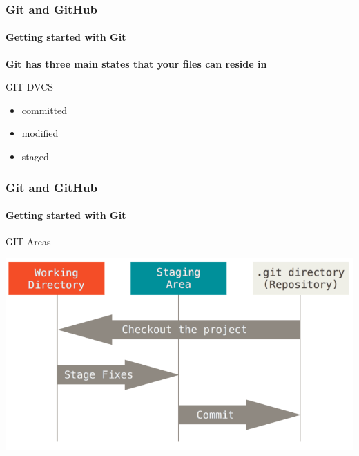 \begin{frame}
    \frametitle{Git and GitHub}
    \framesubtitle{Getting started with Git}
    \addtocounter{nframe}{1}
    
    \textbf{Git has three main states that your files can reside in}

    \begin{block}{GIT DVCS}
       \begin{itemize}
           \item committed
           \item modified 
           \item staged
       \end{itemize}
    
    \end{block}

\end{frame}

\begin{frame}
    \frametitle{Git and GitHub}
    \framesubtitle{Getting started with Git}
    \addtocounter{nframe}{1}
    
    \begin{block}{GIT Areas}
        \begin{center}

            \includegraphics[width=.9\textwidth]{imgs/git-areas.png}
    
        \end{center}
    
    \end{block}
    

\end{frame}

